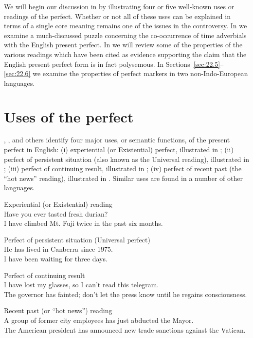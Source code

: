We will begin our discussion in  by illustrating four or five well-known uses or readings of the perfect. Whether or not all of these uses can be explained in terms of a single core meaning remains one of the issues in the controversy. In  we examine a much-discussed puzzle concerning the co-occurrence of time adverbials with the English present perfect. In  we will review some of the properties of the various readings which have been cited as evidence supporting the claim that the English present perfect form is in fact polysemous. In Sections~\ref{sec:22.5}--\ref{sec:22.6} we examine the properties of perfect markers in two non-Indo-European languages.


\section{Uses of the perfect}\label{sec:22.2}

\citet{McCawley1971}, \citet{Comrie1976}, and others identify four major uses, or semantic functions, of the present perfect in English: (i) experiential (or Existential) perfect, illustrated in ; (ii) perfect of persistent situation (also known as the Universal reading), illustrated in ; (iii) perfect of continuing result, illustrated in ; (iv) perfect of recent past (the “hot news” reading), illustrated in . Similar uses are found in a number of other languages.


\ea
Experiential (or Existential) reading\\
\ea Have you ever tasted fresh durian?\\
\ex I have climbed Mt. Fuji twice in the past six months.
                       \z
\z

\ea
Perfect of persistent situation (Universal perfect)\\
\ea He has lived in Canberra since 1975.\\
\ex I have been waiting for three days.
                       \z
\z

\ea
Perfect of continuing result\\
\ea I have lost my glasses, so I can’t read this telegram.\\
\ex The governor has fainted; don’t let the press know until he regains consciousness.
                       \z
\z

\ea
Recent past (or “hot news”) reading\\
\ea A group of former city employees has just abducted the Mayor.\\
\ex The American president has announced new trade sanctions against the Vatican.
                       \z
\z


